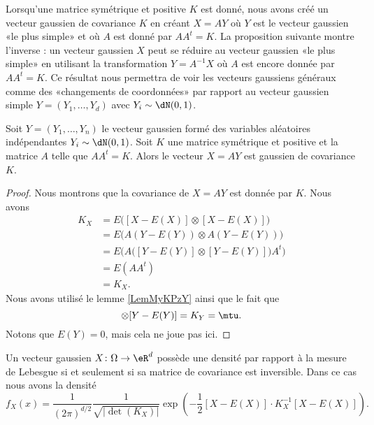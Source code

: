 Lorsqu'une matrice symétrique et positive \( K\) est donné, nous avons créé un vecteur gaussien de covariance \( K\) en créant \( X=AY\) où \( Y\) est le vecteur gaussien «le plus simple» et où \( A\) est donné par \( AA^t=K\). La proposition suivante montre l'inverse : un vecteur gaussien \( X\) peut se réduire au vecteur gaussien «le plus simple» en utilisant la transformation \( Y=A^{-1}X\) où \( A\) est encore donnée par \( AA^t=K\). Ce résultat nous permettra de voir les vecteurs gaussiens généraux comme des «changements de coordonnées» par rapport au vecteur gaussien simple \( Y=(Y_1,\ldots, Y_d)\) avec \( Y_i\sim\dN(0,1)\).

\begin{proposition} \label{PropGacmRi}
    Soit \( Y=(Y_1,\ldots, Y_n)\) le vecteur gaussien formé des variables aléatoires indépendantes \( Y_i\sim\dN(0,1)\). Soit \( K\) une matrice symétrique et positive et la matrice \( A\) telle que \( AA^t=K\). Alors le vecteur \( X=AY\) est gaussien de covariance \( K\). 
\end{proposition}

\begin{proof}
    Nous montrons que la covariance de \( X=AY\) est donnée par \( K\). Nous avons 
    \begin{subequations}
        \begin{align}
            K_X&=E\big( [X-E(X)]\otimes [X-E(X)] \big)\\
            &=E\big( A(Y-E(Y))\otimes A(Y-E(Y)) \big)\\
            &=E\Big( A\big( [Y-E(Y)]\otimes [Y-E(Y)] \big)A^t \Big)\\
            &=E(AA^t)\\
            &=K_X.
        \end{align}
    \end{subequations}
    Nous avons utilisé le lemme \ref{LemMyKPzY} ainsi que le fait que 
    \begin{equation}
        [Y-E(Y)]\otimes [Y-E(Y)]=K_Y=\mtu.
    \end{equation}
    Notons que \( E(Y)=0\), mais cela ne joue pas ici.
\end{proof}

\begin{theorem}
    Un vecteur gaussien \( X\colon \Omega\to \eR^d\) possède une densité par rapport à la mesure de Lebesgue si et seulement si sa matrice de covariance est inversible. Dans ce cas nous avons la densité
    \begin{equation}        \label{EqzulwmY}
        f_X(x)=\frac{1}{ (2\pi)^{d/2} }\frac{1}{ \sqrt{| \det(K_X) |} }\exp\left( -\frac{ 1 }{2}[X-E(X)]\cdot K_X^{-1}[X-E(X)] \right).
    \end{equation}
\end{theorem}

